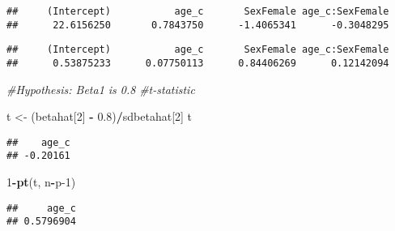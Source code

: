 \documentclass[
]{article}
\newenvironment{Shaded}{\begin{snugshade}}{\end{snugshade}}
\newcommand{\CommentTok}[1]{\textcolor[rgb]{0.56,0.35,0.01}{\textit{#1}}}
\newcommand{\DecValTok}[1]{\textcolor[rgb]{0.00,0.00,0.81}{#1}}
\newcommand{\FloatTok}[1]{\textcolor[rgb]{0.00,0.00,0.81}{#1}}
\newcommand{\FunctionTok}[1]{\textcolor[rgb]{0.13,0.29,0.53}{\textbf{#1}}}
\newcommand{\NormalTok}[1]{#1}
\newcommand{\OtherTok}[1]{\textcolor[rgb]{0.56,0.35,0.01}{#1}}
\newcommand{\SpecialCharTok}[1]{\textcolor[rgb]{0.81,0.36,0.00}{\textbf{#1}}}
\begin{document}
\begin{verbatim}
##     (Intercept)           age_c       SexFemale age_c:SexFemale 
##      22.6156250       0.7843750      -1.4065341      -0.3048295
\end{verbatim}

\begin{Shaded}
\end{Shaded}

\begin{verbatim}
##     (Intercept)           age_c       SexFemale age_c:SexFemale 
##      0.53875233      0.07750113      0.84406269      0.12142094
\end{verbatim}

\begin{Shaded}
\begin{Highlighting}[]
\CommentTok{\#Hypothesis: Beta1 is 0.8}
\CommentTok{\#t{-}statistic}

\NormalTok{t }\OtherTok{\textless{}{-}}\NormalTok{ (betahat[}\DecValTok{2}\NormalTok{] }\SpecialCharTok{{-}} \FloatTok{0.8}\NormalTok{)}\SpecialCharTok{/}\NormalTok{sdbetahat[}\DecValTok{2}\NormalTok{]}
\NormalTok{t}
\end{Highlighting}
\end{Shaded}

\begin{verbatim}
##    age_c 
## -0.20161
\end{verbatim}

\begin{Shaded}
\begin{Highlighting}[]
\DecValTok{1}\SpecialCharTok{{-}}\FunctionTok{pt}\NormalTok{(t, n}\SpecialCharTok{{-}}\NormalTok{p}\DecValTok{{-}1}\NormalTok{)}
\end{Highlighting}
\end{Shaded}

\begin{verbatim}
##     age_c 
## 0.5796904
\end{verbatim}
\end{document}
